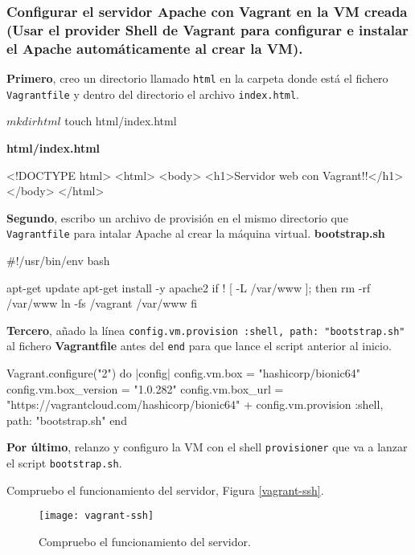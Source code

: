 \subsubsection{Configurar el servidor Apache con Vagrant en la VM creada (Usar el provider Shell de Vagrant para configurar e instalar el Apache automáticamente al crear la VM).}
\par \textbf{Primero}, creo un directorio llamado \texttt{html} en la carpeta donde está el fichero \texttt{Vagrantfile} 
y dentro del directorio el archivo \texttt{index.html}.
\begin{listing}[style=consola]
    $ mkdir html
    $ touch html/index.html
\end{listing}
\textbf{html/index.html}
\begin{listing}
    <!DOCTYPE html>
    <html>
        <body>
        <h1>Servidor web con Vagrant!!</h1>
        </body>
    </html>
 \end{listing}
 \par \textbf{Segundo}, escribo un archivo de provisión en el mismo directorio que \texttt{Vagrantfile}
 para intalar Apache al crear la máquina virtual.
 \textbf{bootstrap.sh}
 \begin{listing}
    #!/usr/bin/env bash

    apt-get update
    apt-get install -y apache2
    if ! [ -L /var/www ]; then
        rm -rf /var/www
        ln -fs /vagrant /var/www
    fi 
\end{listing}
\par \textbf{Tercero}, añado la línea \texttt{config.vm.provision :shell, path: "bootstrap.sh"}
 al fichero \textbf{Vagrantfile} antes del \texttt{end} para que lance el script anterior al inicio.
\begin{listing}
    Vagrant.configure("2") do |config|
        config.vm.box = "hashicorp/bionic64"
        config.vm.box_version = "1.0.282"
        config.vm.box_url = "https://vagrantcloud.com/hashicorp/bionic64"
  +     config.vm.provision :shell, path: "bootstrap.sh"
    end
 \end{listing}
 \par \textbf{Por último}, relanzo y configuro la VM con el shell \texttt{provisioner} que va a
 lanzar el script \texttt{bootstrap.sh}.
\par Compruebo el funcionamiento del servidor, Figura \ref{vagrant-ssh}.
\begin{figure}[H]
    \texttt{[image: vagrant-ssh]}
    \centering
    \caption{Compruebo el funcionamiento del servidor.}
    \label{fig:vagrant-ssh}
 \end{figure}

